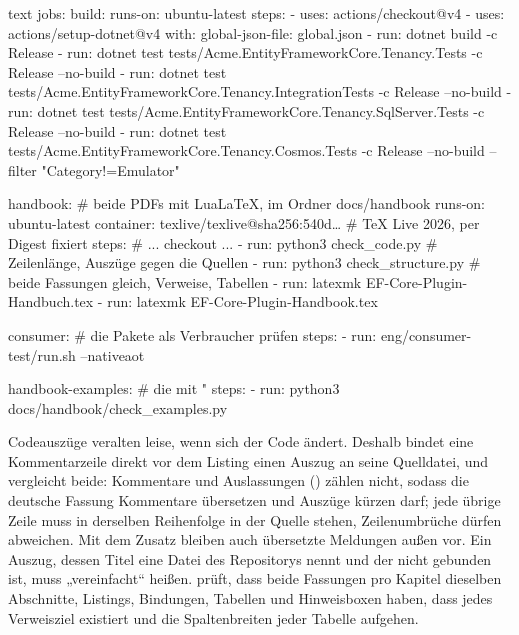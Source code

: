 \begin{sourcecode}{text}
jobs:
  build:
    runs-on: ubuntu-latest
    steps:
      - uses: actions/checkout@v4
      - uses: actions/setup-dotnet@v4
        with: { global-json-file: global.json }
      - run: dotnet build -c Release
      - run: dotnet test tests/Acme.EntityFrameworkCore.Tenancy.Tests -c Release --no-build
      - run: dotnet test tests/Acme.EntityFrameworkCore.Tenancy.IntegrationTests
          -c Release --no-build
      - run: dotnet test tests/Acme.EntityFrameworkCore.Tenancy.SqlServer.Tests
          -c Release --no-build
      - run: dotnet test tests/Acme.EntityFrameworkCore.Tenancy.Cosmos.Tests
          -c Release --no-build --filter "Category!=Emulator"

  handbook:                            # beide PDFs mit LuaLaTeX, im Ordner docs/handbook
    runs-on: ubuntu-latest
    container: texlive/texlive@sha256:540d…   # TeX Live 2026, per Digest fixiert
    steps:
      # ... checkout ...
      - run: python3 check_code.py       # Zeilenlänge, Auszüge gegen die Quellen
      - run: python3 check_structure.py  # beide Fassungen gleich, Verweise, Tabellen
      - run: latexmk EF-Core-Plugin-Handbuch.tex
      - run: latexmk EF-Core-Plugin-Handbook.tex

  consumer:                            # die Pakete als Verbraucher prüfen
    steps:
      - run: eng/consumer-test/run.sh --nativeaot

  handbook-examples:                   # die mit "%
    steps:
      - run: python3 docs/handbook/check_examples.py
\end{sourcecode}

Codeauszüge veralten leise, wenn sich der Code ändert. Deshalb bindet eine Kommentarzeile
 direkt vor dem Listing einen Auszug an seine Quelldatei, und
 vergleicht beide: Kommentare und
Auslassungen () zählen nicht, sodass die deutsche Fassung Kommentare übersetzen und
Auszüge kürzen darf; jede übrige Zeile muss in derselben Reihenfolge in der Quelle stehen,
Zeilenumbrüche dürfen abweichen. Mit dem Zusatz  bleiben auch übersetzte
Meldungen außen vor. Ein Auszug, dessen Titel eine Datei des Repositorys nennt und der nicht
gebunden ist, muss „vereinfacht“ heißen. 
prüft, dass beide Fassungen pro Kapitel dieselben Abschnitte, Listings, Bindungen, Tabellen und
Hinweisboxen haben, dass jedes Verweisziel existiert und die Spaltenbreiten jeder Tabelle
aufgehen.

